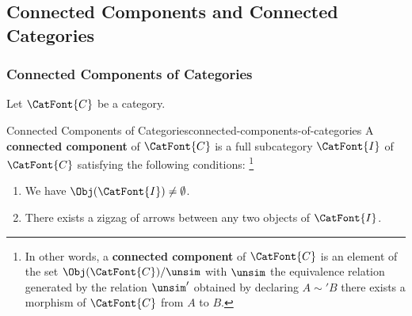 \subsection{Connected Components and Connected Categories}\label{subsection-connected-components-and-connected-categories}
\subsubsection{Connected Components of Categories}\label{subsubsection-the-quadruple-adjunction-with-sets-connected-components-of-categories}
Let $\CatFont{C}$ be a category.
\begin{definition}{Connected Components of Categories}{connected-components-of-categories}%
    A \textbf{connected component} of $\CatFont{C}$ is a full subcategory $\CatFont{I}$ of $\CatFont{C}$ satisfying the following conditions:%
    \footnote{%
        In other words, a \textbf{connected component} of $\CatFont{C}$ is an element of the set $\Obj(\CatFont{C})/\unsim$ with $\unsim$ the equivalence relation generated by the relation $\unsim'$ obtained by declaring $A\sim' B$ \textiff there exists a morphism of $\CatFont{C}$ from $A$ to $B$.
        \par\vspace*{\TCBBoxCorrection}
    }%
    \begin{enumerate}
        \item{}We have $\Obj(\CatFont{I})\neq\emptyset$.
        \item{}There exists a zigzag of arrows between any two objects of $\CatFont{I}$.
    \end{enumerate}
\end{definition}
